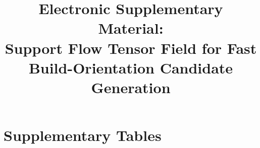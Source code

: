 \documentclass[11pt,a4paper]{article}
\title{Electronic Supplementary Material:\\ Support Flow Tensor Field for Fast Build-Orientation Candidate Generation}
\date{}
\begin{document}
\maketitle

\section*{Supplementary Tables}

\begin{table}[H]
\footnotesize
\centering
\caption{Computation time of the four implementations for the $35$ meshes of the five groups.
$t_{\mathrm{CPU}}$ and $t_{\mathrm{CUDA}}$ are the TOMO\_CPU/TOMO\_CUDA $1^\circ$ exhaustive sweep ($\theta_c=60^\circ$) DLL times respectively,
$t_{\mathrm{py}}$ is the Python SFTF candidate evaluation, and $t_{\mathrm{C++}}$ is the SFTF\_C++ pure computation time.
hit is the number of valid face-to-face supports of the Python SFTF top direction.
The speed columns are $t_{\mathrm{CPU}}/t_{\mathrm{py}}$ and $t_{\mathrm{CPU}}/t_{\mathrm{C++}}$ respectively.
The swapped-in E-group meshes (E2, E3, E4, E9) were measured in a later session; their four rows are internally consistent but not directly comparable with the timings of the other rows.}
\label{stab:fivegroup-timing}
\end{table}
\end{document}

